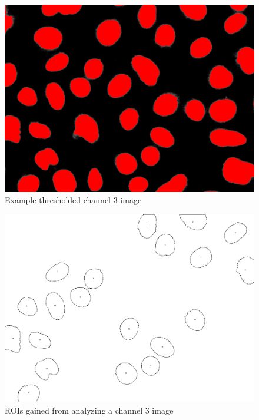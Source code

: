 \documentclass[a4paper, 12pt, twoside]{article}
\begin{document}
\begin{figure}[H]
\centering
\includegraphics[height=\linewidth, angle=90]{images/example_Kanal3_corrected_threshold}
Example thresholded channel 3 image
\end{figure}

\begin{figure}[H]
\centering
\includegraphics[height=\linewidth, angle=90]{images/example_Kanal3_rois}
ROIs gained from analyzing a channel 3 image
\end{figure}
\end{document}
